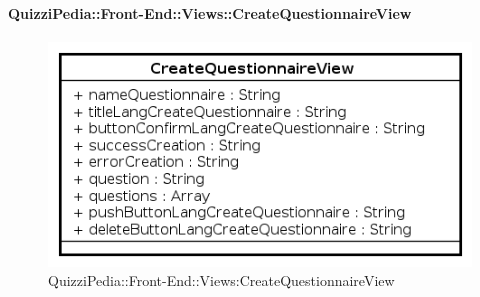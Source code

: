 \paragraph{QuizziPedia::Front-End::Views::CreateQuestionnaireView}
\begin{figure} [ht]
	\centering
	\includegraphics[scale=0.80]{UML/Classi/Front-End/QuizziPedia_Front-end_CreateQuestionnaireView.png}
	\caption{QuizziPedia::Front-End::Views:CreateQuestionnaireView}
\end{figure} \FloatBarrier
